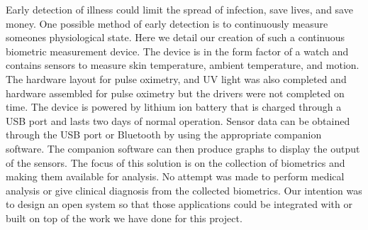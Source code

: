 Early detection of illness could limit the spread of infection, save lives, and
save money.  One possible method of early detection is to continuously measure
someones physiological state.  Here we detail our creation of such a continuous
biometric measurement device.  The device is in the form factor of a watch and
contains sensors to measure skin temperature, ambient temperature, and motion.  
The hardware layout for pulse oximetry, and UV light was also completed and 
hardware assembled for pulse oximetry but the drivers were not completed on time.
The device is powered by lithium ion battery that is charged
through a USB port and lasts two days of normal operation.  Sensor data can be
obtained through the USB port or Bluetooth by using the appropriate companion
software.  The companion software can then produce graphs to display the output
of the sensors.  The focus of this solution is on the collection of biometrics
and making them available for analysis.  No attempt was made to perform medical
analysis or give clinical diagnosis from the collected biometrics.  Our
intention was to design an open system so that those applications could be
integrated with or built on top of the work we have done for this project.

